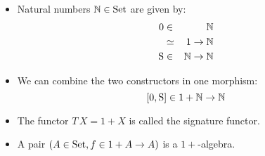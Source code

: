 \documentclass[handout]{beamer}
\begin{document}
\begin{frame}
  \begin{itemize}
  \item Natural numbers $\mathbb{N}\in\mathrm{Set}$ are given by:
    \begin{eqnarray*}
      0 & \in & \mathbb{N}\\
        & \simeq & 1 \to \mathbb{N}\\
      \mathrm{S} & \in & \mathbb{N} \to \mathbb{N}
    \end{eqnarray*}

  \item We can combine the two constructors in one morphism:
    \[ [0,\mathrm{S}] \in 1+\mathbb{N} \to \mathbb{N} \]

  \item The functor $T\,X = 1+X$ is called the signature functor.

  \item A pair $(A\in\mathrm{Set},f\in 1+A \to A)$ is a $1+$-algebra.



  \end{itemize}
\end{frame}
\end{document}
